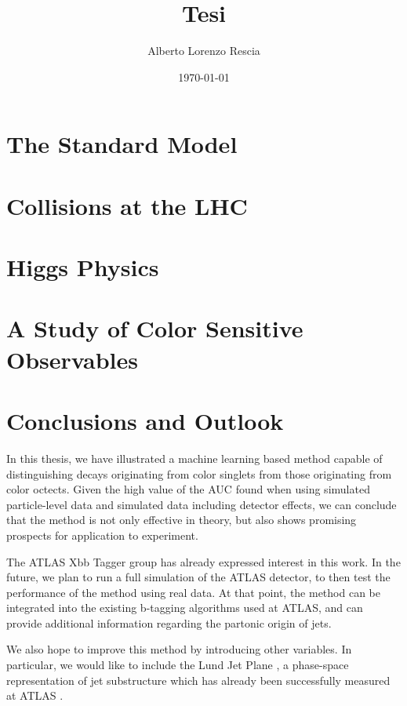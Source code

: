 \documentclass[10pt,a4paper]{book}
\title{Tesi}
\author{Alberto Lorenzo Rescia}
\date{\today}
\begin{document}
\tableofcontents

\chapter{The Standard Model}


\chapter{Collisions at the LHC}


\chapter{Higgs Physics}


\chapter{A Study of Color Sensitive Observables}


\chapter*{Conclusions and Outlook}

In this thesis, we have illustrated a machine learning based method capable of distinguishing decays originating from color singlets from those originating from color octects. Given the high value of the AUC found when using simulated particle-level data and simulated data including detector effects, we can conclude that the method is not only effective in theory, but also shows promising prospects for application to experiment. 

The ATLAS Xbb Tagger group has already expressed interest in this work. In the future, we plan to run a full simulation of the ATLAS detector, to then test the performance of the method using real data. At that point, the method can be integrated into the existing   b-tagging algorithms used at ATLAS, and can provide additional information regarding the partonic origin of jets.

We also hope to improve this method by introducing other variables. In particular, we would like to include the Lund Jet Plane \cite{Dreyer:2018nbf}, a phase-space representation of jet substructure which has already been successfully measured at ATLAS \cite{ATLAS:2020bbn}.
\end{document}

